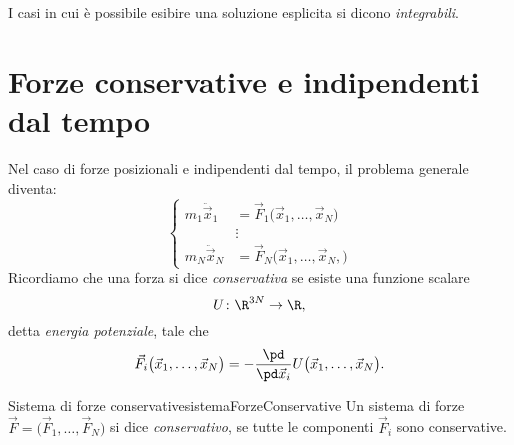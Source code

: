 \begin{notz}
	I casi in cui è possibile esibire una soluzione esplicita si dicono \emph{integrabili}.
\end{notz}

\section{Forze conservative e indipendenti dal tempo}

Nel caso di forze posizionali e indipendenti dal tempo, il problema generale diventa:
\[
	\left\{\begin{aligned}
		m_1 \ddot{\vec{x}}_1 & = \vec{F}_1\big(\vec{x}_1,\ldots,\vec{x}_N\big)  \\
		                     & \vdots                                           \\
		m_N \ddot{\vec{x}}_N & = \vec{F}_N\big(\vec{x}_1,\ldots,\vec{x}_N,\big)
	\end{aligned}\right.
\]
Ricordiamo che una forza si dice \emph{conservativa} se esiste una funzione scalare
\[
	U\colon \R^{3N} \to \R,
\]
detta \emph{energia potenziale}, tale che
\[
	\vec{F}_i \big(\vec{x}_1, \ldots, \vec{x}_N\big) = - \frac{\pd}{\pd\vec{x}_i} U\big(\vec{x}_1, \ldots, \vec{x}_N\big).
\]

\begin{defn}{Sistema di forze conservative}{sistemaForzeConservative}
	Un sistema di forze \(\vec{F}=\big(\vec{F}_1, \ldots, \vec{F}_N\big)\) si dice \emph{conservativo}, se tutte le componenti \(\vec{F}_i\) sono conservative.
\end{defn}

